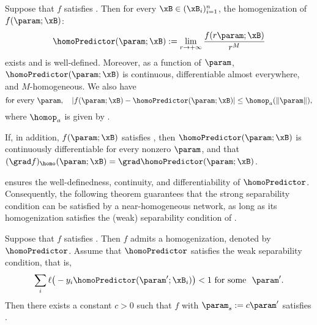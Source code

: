 \begin{theorem}[Homogenization]
\label{thm:homogenization}
Suppose that $f$ satisfies .
Then for every $\xB\in(\xB_i)_{i=1}^n$, the homogenization of $f(\param; \xB)$:
\begin{equation*}
    \homoPredictor (\param; \xB) := \lim_{r \to +\infty} \frac{f(r \param; \xB)}{r^M}
\end{equation*}
exists and is well-defined.
Moreover, as a function of $\param$, $\homoPredictor (\param; \xB)$ is continuous, differentiable almost everywhere, and $M$-homogeneous. 
We also have
\[
\text{for every } \param,\quad 
    \left\vert f(\param; \xB) - \homoPredictor (\param; \xB) \right\vert \le \homop_a( \left\| \param \right\| ),
\]
where $\homop_a$ is given by .

If, in addition, $f(\param;\xB)$ satisfies ,
then $\homoPredictor(\param;\xB)$ is continuously differentiable for every nonzero $\param$, and that $(\grad f)_\homo (\param; \xB) = \grad \homoPredictor (\param; \xB)$. %
\end{theorem}
 ensures the well-definedness, continuity, and differentiability of $\homoPredictor$.
Consequently, the following theorem guarantees that the strong separability condition can be satisfied by a near-homogeneous network, as long as its homogenization satisfies the (weak) separability condition of \cite{lyu2020gradient}.

\begin{theorem}
\label{cor:Initial condition via homogeneization}
Suppose that $f$ satisfies . Then $f$ admits a homogenization, denoted by $\homoPredictor$.
Assume that $\homoPredictor$ satisfies the weak separability condition, that is, 
\[
\sum_{i} \ell\big(- y_i \homoPredictor(\param^\prime ;\xB_i) \big) < 1\   \text{for some}\ \ \param^\prime.
\]
Then there exists a constant $c>0$ such that $f$ with $\param_s := c \param^\prime $ satisfies  .
\end{theorem}

